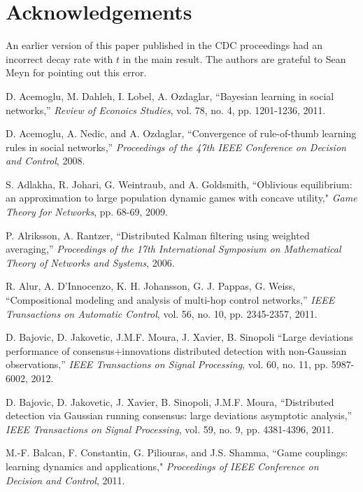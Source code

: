 \documentclass[final]{siamltex}
\begin{document}
\section{Acknowledgements} An earlier version of this paper published in the CDC proceedings had an incorrect decay rate with $t$ in the main result. The authors are grateful to Sean Meyn for pointing out this error.
 
 
\begin{thebibliography}{99}

 D. Acemoglu, M. Dahleh, I. Lobel, A. Ozdaglar, ``Bayesian learning in social networks,'' {\em Review of 
Econoics Studies}, vol. 78, no. 4, pp. 1201-1236, 2011.

 D. Acemoglu, A. Nedic, and A. Ozdaglar, ``Convergence of rule-of-thumb learning rules in social networks,'' 
{\em Proceedings of the 47th IEEE Conference on Decision and Control},  2008.

 S. Adlakha, R. Johari, G. Weintraub, and A. Goldsmith, ``Oblivious equilibrium: an approximation to large population
dynamic games with concave utility," {\em Game Theory for
Networks}, pp. 68-69, 2009.

 P. Alriksson, A. Rantzer, ``Distributed Kalman filtering using weighted averaging,'' 
{\em Proceedings of the 17th International Symposium on Mathematical Theory of Networks and Systems}, 
2006. 

 R. Alur, A. D'Innocenzo, K. H. Johansson, G. J. Pappas, G. Weiss, ``Compositional modeling and analysis
of multi-hop control networks,'' {\em IEEE Transactions on Automatic Control}, vol. 56, no. 10, pp. 2345-2357, 2011.

 D. Bajovic, D. Jakovetic, J.M.F. Moura, J. Xavier, B. Sinopoli ``Large deviations performance of 
consensus+innovations distributed detection with non-Gaussian observations,'' 
{\em IEEE Transactions on Signal Processing}, vol. 60, no. 11, pp. 5987-6002, 2012.

 D. Bajovic, D. Jakovetic, J. Xavier, B. Sinopoli, J.M.F. Moura, ``Distributed detection via Gaussian running consensus:
large deviations asymptotic analysis,'' {\em IEEE Transactions on Signal Processing}, vol. 59, no. 9, pp. 4381-4396, 2011.

 M.-F. Balcan, F. Constantin, G. Piliouras, and J.S. Shamma, ``Game couplings: learning dynamics and applications," {\em Proceedings of  IEEE Conference on Decision and Control}, 2011. 


\end{thebibliography}
\end{document}
